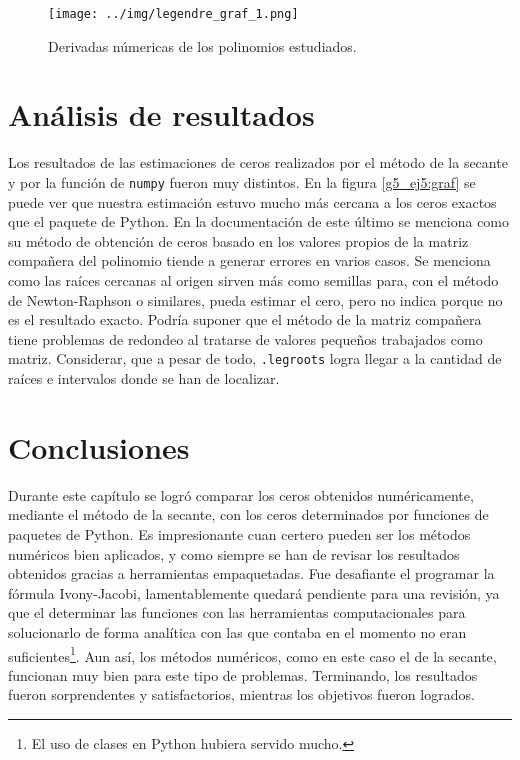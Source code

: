 \documentclass[../portafolio.tex]{subfiles}
\begin{document}
\begin{figure}
\centering
\texttt{[image: ../img/legendre\_graf\_1.png]}
\caption{Derivadas númericas de los polinomios estudiados.}\label{g5_ej5:graf1}
\end{figure}

\section{Análisis de resultados}

Los resultados de las estimaciones de ceros realizados por el método de la secante y por la función de \texttt{numpy} fueron muy distintos. En la figura \ref{g5_ej5:graf} se puede ver que nuestra estimación estuvo mucho más cercana a los ceros exactos que el paquete de Python. En la documentación de este último \citep{numpy} se menciona como su método de obtención de ceros basado en los valores propios de la matriz compañera del polinomio tiende a generar errores en varios casos. Se menciona como las raíces cercanas al origen sirven más como semillas para, con el método de Newton-Raphson o similares, pueda estimar el cero, pero no indica porque no es el resultado exacto. Podría suponer que el método de la matriz compañera tiene problemas de redondeo al tratarse de valores pequeños trabajados como matriz. Considerar, que a pesar de todo, \texttt{.legroots} logra llegar a la cantidad de raíces e intervalos donde se han de localizar.

\section*{Conclusiones}
Durante este capítulo se logró comparar los ceros obtenidos numéricamente, mediante el método de la secante, con los ceros determinados por funciones de paquetes de Python. 
Es impresionante cuan certero pueden ser los métodos numéricos bien aplicados, y como siempre se han de revisar los resultados obtenidos gracias a herramientas empaquetadas. Fue desafiante el programar la fórmula Ivony-Jacobi, lamentablemente quedará pendiente para una revisión, ya que el determinar las funciones con las herramientas computacionales para solucionarlo de forma analítica con las que contaba en el momento no eran suficientes\footnote{El uso de clases en Python hubiera servido mucho.}. Aun así, los métodos numéricos, como en este caso el de la secante, funcionan muy bien para este tipo de problemas. Terminando, los resultados fueron sorprendentes y satisfactorios, mientras los objetivos fueron logrados.
\end{document}

